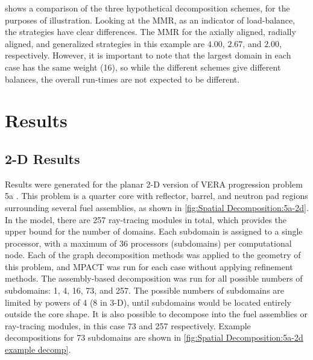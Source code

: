 {{     shows a comparison of the three hypothetical decomposition schemes, for the purposes of illustration.
    Looking at the \ac{MMR}, as an indicator of load-balance, the strategies have clear differences.
    The \ac{MMR} for the axially aligned, radially aligned, and generalized strategies in this example are $4.00$, $2.67$, and $2.00$, respectively.
    However, it is important to note that the largest domain in each case has the same weight (16), so while the different schemes give different balances, the overall run-times are not expected to be different.
  }
  \section{Results}{\label{sec:Spatial Decomposition:Results}
    \subsection{2-D Results}{\label{ssec:Spatial Decomposition:2-D Results}
      Results were generated for the planar 2-D version of VERA progression problem 5a \cite{VERAProblems}.
      This problem is a quarter core with reflector, barrel, and neutron pad regions surrounding several fuel assemblies, as shown in \cref{fig:Spatial Decomposition:5a-2d}.
      In the model, there are 257 ray-tracing modules in total, which provides the upper bound for the number of domains.
      Each subdomain is assigned to a single processor, with a maximum of 36 processors (subdomains) per computational node.
      Each of the graph decomposition methods was applied to the geometry of this problem, and MPACT was run for each case without applying refinement methods.
      The assembly-based decomposition was run for all possible numbers of subdomains: 1, 4, 16, 73, and 257.
      The possible numbers of subdomains are limited by powers of 4 (8 in 3-D), until subdomains would be located entirely outside the core shape.
      It is also possible to decompose into the fuel assemblies or ray-tracing modules, in this case 73 and 257 respectively.
      Example decompositions for 73 subdomains are shown in \cref{fig:Spatial Decomposition:5a-2d example decomp}.

}}}
